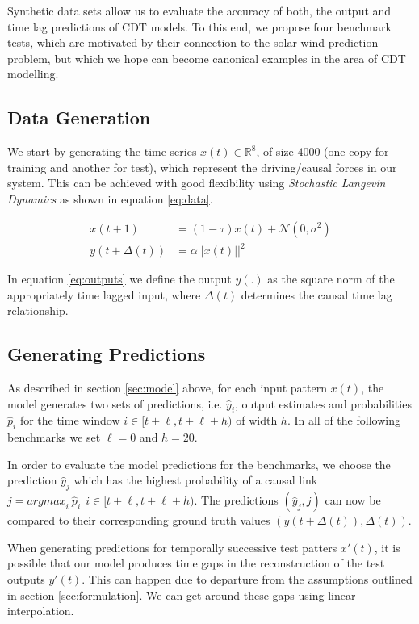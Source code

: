 \documentclass[runningheads]{llncs}
\begin{document}
Synthetic data sets allow us to evaluate the accuracy of both, the output and time lag predictions of 
CDT models. To this end, we propose four benchmark tests, which are motivated by their connection 
to the solar wind prediction problem, but which we hope can become canonical examples in the area 
of CDT modelling.

\subsection{Data Generation}

We start by generating the time series $x(t) \in \mathbb{R}^8$, of size $4000$ 
(one copy for training and another for test), which represent the driving/causal forces in our system. 
This can be achieved with good flexibility using \emph{Stochastic Langevin Dynamics} as shown in 
equation \ref{eq:data}.

\begin{align}
 x(t+1) &= (1 - \tau) x(t) + \mathcal{N}(0, \sigma^2) \label{eq:data}\\
 y(t+\Delta(t)) &= \alpha ||x(t)||^2 \label{eq:outputs}
\end{align}

In equation \ref{eq:outputs} we define the output $y(.)$ as the square norm of the appropriately 
time lagged input, where $\Delta(t)$ determines the causal time lag relationship.

\subsection{Generating Predictions}

As described in section \ref{sec:model} above, for each input pattern $x(t)$, the model 
generates two sets of predictions, i.e. ${\hat{y}_i}$, output estimates and probabilities $\hat{p}_i$ 
for the time window $i \in [t+\ell, t+\ell+h)$ of width $h$. In all of the following benchmarks we set 
$\ell = 0$ and $h = 20$.

In order to evaluate the model predictions for the benchmarks, we choose the prediction $\hat{y}_j$ 
which has the highest probability of a causal link $j = {argmax}_{i} \ \hat{p}_i \ \ i \in [t+\ell, t+\ell+h)$. 
The predictions $(\hat{y}_j, j)$ can now be compared to their corresponding ground truth values 
$(y(t + \Delta(t)), \Delta(t))$. 

When generating predictions for temporally successive test patters $x'(t)$, it is possible that our 
model produces time gaps in the reconstruction of the test outputs $y'(t)$. This can happen due to 
departure from the assumptions outlined in section \ref{sec:formulation}. We can get around these 
gaps using linear interpolation.
\end{document}
